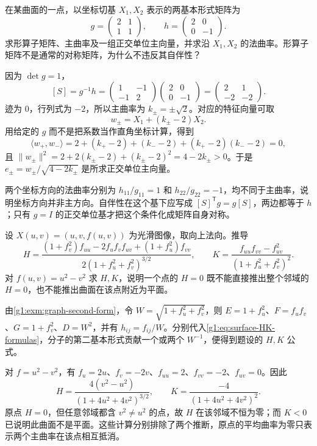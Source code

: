 \begin{exercise}\label{g1:ex:shape-oblique-basis}
	在某曲面的一点，以坐标切基 \(X_1,X_2\) 表示的两基本形式矩阵为
	\[
		g=\begin{pmatrix}2&1\\1&1\end{pmatrix},\qquad h=\begin{pmatrix}2&0\\0&-1\end{pmatrix}.
	\]
	求形算子矩阵、主曲率及一组正交单位主向量，并求沿 \(X_1,X_2\) 的法曲率。形算子矩阵不是通常的对称矩阵，为什么不违反其自伴性？
\end{exercise}
\begin{solution}
	因为 \(\det g=1\)，
	\[
		[S]=g^{-1}h=\begin{pmatrix}1&-1\\-1&2\end{pmatrix}
		\begin{pmatrix}2&0\\0&-1\end{pmatrix}
		=\begin{pmatrix}2&1\\-2&-2\end{pmatrix}.
	\]
	迹为 \(0\)，行列式为 \(-2\)，所以主曲率为 \(k_\pm=\pm\sqrt2\)。对应的特征向量可取
	\[
		w_\pm=X_1+(k_\pm-2)X_2.
	\]
	用给定的 \(g\) 而不是把系数当作直角坐标计算，得到
	\[
		\langle w_+,w_-\rangle
		=2+(k_+-2)+(k_--2)+(k_+-2)(k_--2)=0,
	\]
	且 \(\lVert w_\pm\rVert^2=2+2(k_\pm-2)+(k_\pm-2)^2=4-2k_\pm>0\)。于是 \(e_\pm=w_\pm/\sqrt{4-2k_\pm}\) 是所求正交单位主向量。

	两个坐标方向的法曲率分别为 \(h_{11}/g_{11}=1\) 和 \(h_{22}/g_{22}=-1\)，均不同于主曲率，说明坐标方向并非主方向。自伴性在这个基下应写成 \([S]^{\mathsf T}g=g[S]\)，两边都等于 \(h\)；只有 \(g=I\) 的正交单位基才把这个条件化成矩阵自身对称。
\end{solution}

\begin{exercise}\label{g1:ex:graph-mean-curvature}
	设 \(X(u,v)=(u,v,f(u,v))\) 为光滑图像，取向上法向。推导
	\[
		H=\frac{(1+f_v^2)f_{uu}-2f_uf_vf_{uv}+(1+f_u^2)f_{vv}}
		{2(1+f_u^2+f_v^2)^{3/2}},
		\qquad
		K=\frac{f_{uu}f_{vv}-f_{uv}^2}{(1+f_u^2+f_v^2)^2}.
	\]
	对 \(f(u,v)=u^2-v^2\) 求 \(H,K\)，说明一个点的 \(H=0\) 既不能直接推出整个邻域的 \(H=0\)，也不能推出曲面在该点附近为平面。
\end{exercise}
\begin{solution}
	由\cref{g1:exm:graph-second-form}，令 \(W=\sqrt{1+f_u^2+f_v^2}\)，则 \(E=1+f_u^2\)、\(F=f_uf_v\)、\(G=1+f_v^2\)、\(D=W^2\)，并有 \(h_{ij}=f_{ij}/W\)。分别代入\eqref{g1:eq:surface-HK-formulas}，分子的第二基本形式贡献一个或两个 \(W^{-1}\)，便得到题设的 \(H,K\) 公式。

	对 \(f=u^2-v^2\)，有 \(f_u=2u\)、\(f_v=-2v\)、\(f_{uu}=2\)、\(f_{vv}=-2\)、\(f_{uv}=0\)。因此
	\[
		H=\frac{4(v^2-u^2)}{(1+4u^2+4v^2)^{3/2}},\qquad
		K=\frac{-4}{(1+4u^2+4v^2)^2}.
	\]
	原点 \(H=0\)，但任意邻域都含 \(v^2\ne u^2\) 的点，故 \(H\) 在该邻域不恒为零；而 \(K<0\) 已说明此曲面不是平面。这些计算分别排除了两个推断，原点的平均曲率为零只表示两个主曲率在该点相互抵消。
\end{solution}


